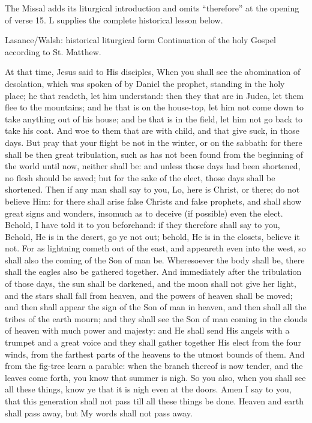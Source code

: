 The Missal adds its liturgical introduction and omits ``therefore''
at the opening of verse 15. L supplies the complete historical lesson below.

\begin{englishwitness}{Lasance/Walsh: historical liturgical form}
Continuation of the holy Gospel according to St. Matthew.

At that time, Jesus said to His disciples, When you shall see the abomination
of desolation, which was spoken of by Daniel the prophet, standing in the
holy place; he that readeth, let him understand: then they that are in
Judea, let them flee to the mountains; and he that is on the house-top,
let him not come down to take anything out of his house; and he that is
in the field, let him not go back to take his coat. And woe to them that
are with child, and that give suck, in those days. But pray that your
flight be not in the winter, or on the sabbath: for there shall be then
great tribulation, such as has not been found from the beginning of the
world until now, neither shall be: and unless those days had been shortened,
no flesh should be saved; but for the sake of the elect, those days shall
be shortened. Then if any man shall say to you, Lo, here is Christ, or
there; do not believe Him: for there shall arise false Christs and false
prophets, and shall show great signs and wonders, insomuch as to deceive
(if possible) even the elect. Behold, I have told it to you beforehand:
if they therefore shall say to you, Behold, He is in the desert, go ye
not out; behold, He is in the closets, believe it not. For as lightning
cometh out of the east, and appeareth even into the west, so shall also
the coming of the Son of man be. Wheresoever the body shall be, there
shall the eagles also be gathered together. And immediately after the
tribulation of those days, the sun shall be darkened, and the moon shall
not give her light, and the stars shall fall from heaven, and the powers
of heaven shall be moved; and then shall appear the sign of the Son of
man in heaven, and then shall all the tribes of the earth mourn; and they
shall see the Son of man coming in the clouds of heaven with much power
and majesty: and He shall send His angels with a trumpet and a great
voice and they shall gather together His elect from the four winds, from
the farthest parts of the heavens to the utmost bounds of them. And from
the fig-tree learn a parable: when the branch thereof is now tender,
and the leaves come forth, you know that summer is nigh. So you also,
when you shall see all these things, know ye that it is nigh even at
the doors. Amen I say to you, that this generation shall not pass till
all these things be done. Heaven and earth shall pass away, but My words
shall not pass away.

\end{englishwitness}


